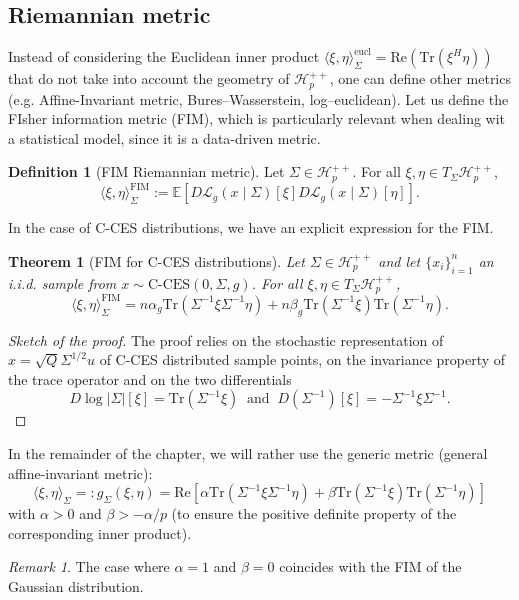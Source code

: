 \documentclass[10pt,a4paper]{book}
\theoremstyle{definition}
\newtheorem{defn}{Definition}[section]
\theoremstyle{plain}
\newtheorem{thm}{Theorem}[section]
\theoremstyle{remark}
\newtheorem{rmk}{Remark}[section]
\newcommand \Esp {\mathbb{E}}
\begin{document}
\subsection{Riemannian metric}
Instead of considering the Euclidean inner product $\langle \xi,\eta\rangle_{\Sigma}^{\text{eucl}}=\text{Re}(\text{Tr}(\xi^{H}\eta))$ that do not take into account the geometry of $\mathcal{H}_{p}^{++}$, one can define other metrics (e.g. Affine-Invariant metric, Bures--Wasserstein, log--euclidean). Let us define the FIsher information metric (FIM), which is particularly relevant when dealing wit a statistical model, since it is a data-driven metric.
\begin{defn}[FIM Riemannian metric]
Let $\Sigma\in \mathcal{H}_p^{++}$. For all $\xi, \eta \in T_{\Sigma}\mathcal{H}_{p}^{++}$, 
$$\langle \xi,\eta \rangle_{\Sigma}^{\text{FIM}}:=\Esp\left[ D\mathcal{L}_g(x\mid \Sigma)[\xi] D\mathcal{L}_g(x\mid \Sigma)[\eta] \right].$$
\end{defn}
In the case of C-CES distributions, we have an explicit expression for the FIM.
\begin{thm}[FIM for C-CES distributions]
Let $\Sigma\in \mathcal{H}_p^{++}$ and let $\{x_i\}_{i=1}^{n}$ an i.i.d. sample from $x\sim \text{C-CES}(0,\Sigma,g)$. For all $\xi, \eta \in T_{\Sigma}\mathcal{H}_{p}^{++}$, 
$$\langle \xi,\eta\rangle_{\Sigma}^{\text{FIM}}=n\alpha_g\text{Tr}(\Sigma^{-1}\xi\Sigma^{-1}\eta)+n\beta_g\text{Tr}(\Sigma^{-1}\xi)\text{Tr}(\Sigma^{-1}\eta).$$
\end{thm}
\begin{proof}[Sketch of the proof]
The proof relies on the stochastic representation of $x=\sqrt{Q}\Sigma^{1/2}u$ of C-CES  distributed sample points, on the invariance property of the trace operator and on the two differentials
$$D\log|\Sigma|[\xi]=\text{Tr}(\Sigma^{-1}\xi)~\text{ and }~D(\Sigma^{-1})[\xi]=-\Sigma^{-1}\xi\Sigma^{-1}.$$
\end{proof}
In the remainder of the chapter, we will rather use the generic metric (general affine-invariant metric):
$$\langle \xi, \eta\rangle_{\Sigma}=:g_{\Sigma}(\xi,\eta)=\text{Re}\left[\alpha \text{Tr}(\Sigma^{-1}\xi\Sigma^{-1}\eta)+\beta \text{Tr}(\Sigma^{-1}\xi)\text{Tr}(\Sigma^{-1}\eta) \right]$$
with $\alpha>0$ and $\beta>-\alpha/p$ (to ensure the positive definite property of the corresponding inner product).
\begin{rmk} The case where $\alpha=1$ and $\beta=0$ coincides with the FIM of the Gaussian distribution.
\end{rmk}
\end{document}
